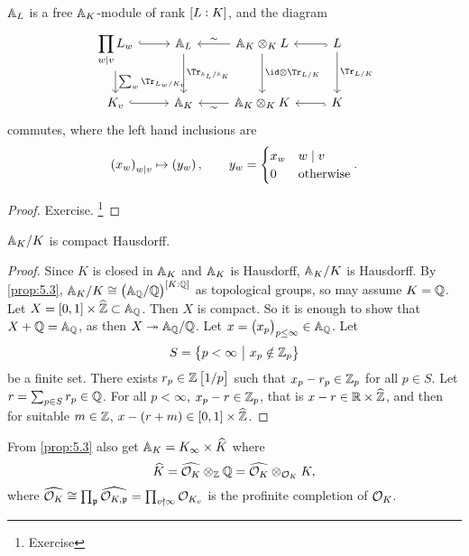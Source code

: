 \pagebreak

\begin{corollary}
$ \AA_L $ is a free $ \AA_K $-module of rank $ \sbr{L : K} $, and the diagram
$$
\begin{tikzcd}
\displaystyle\prod_{w \mid v} L_w \arrow[hookrightarrow]{r} \arrow{d}{\sum_w \Tr_{L_w / K_v}} & \AA_L \arrow{d}{\Tr_{\AA_L / \AA_K}} & \AA_K \otimes_K L \arrow{l}[swap]{\sim} \arrow{d}{\id \otimes \Tr_{L / K}} & L \arrow[hookrightarrow]{l} \arrow{d}{\Tr_{L / K}} \\
K_v \arrow[hookrightarrow]{r} & \AA_K & \AA_K \otimes_K K \arrow{l}{\sim} & K \arrow[hookrightarrow]{l}
\end{tikzcd}
$$
commutes, where the left hand inclusions are
$$ \br{x_w}_{w \mid v} \mapsto \br{y_w}, \qquad y_w =
\begin{cases}
x_w & w \mid v \\
0 & \text{otherwise}
\end{cases}.
$$
\end{corollary}

\begin{proof}
Exercise. \footnote{Exercise}
\end{proof}

\begin{theorem}
$ \AA_K / K $ is compact Hausdorff.
\end{theorem}

\begin{proof}
Since $ K $ is closed in $ \AA_K $ and $ \AA_K $ is Hausdorff, $ \AA_K / K $ is Hausdorff. By \ref{prop:5.3}, $ \AA_K / K \cong \br{\AA_\QQ / \QQ}^{\sbr{K : \QQ}} $ as topological groups, so may assume $ K = \QQ $. Let $ X = \sbr{0, 1} \times \widehat{\ZZ} \subset \AA_\QQ $. Then $ X $ is compact. So it is enough to show that $ X + \QQ = \AA_\QQ $, as then $ X \twoheadrightarrow \AA_\QQ / \QQ $. Let $ x = \br{x_p}_{p \le \infty} \in \AA_\QQ $. Let
$$ S = \cbr{p < \infty \st x_p \notin \ZZ_p} $$
be a finite set. There exists $ r_p \in \ZZ\sbr{1 / p} $ such that $ x_p - r_p \in \ZZ_p $ for all $ p \in S $. Let $ r = \sum_{p \in S} r_p \in \QQ $. For all $ p < \infty $, $ x_p - r \in \ZZ_p $, that is $ x - r \in \RR \times \widehat{\ZZ} $, and then for suitable $ m \in \ZZ $, $ x - \br{r + m} \in \sbr{0, 1} \times \widehat{\ZZ} $.
\end{proof}

From \ref{prop:5.3} also get $ \AA_K = K_\infty \times \widehat{K} $ where
$$ \widehat{K} = \widehat{\OOO_K} \otimes_\ZZ \QQ = \widehat{\OOO_K} \otimes_{\OOO_K} K, $$
where $ \widehat{\OOO_K} \cong \prod_\ppp \widehat{\OOO_{K, \ppp}} = \prod_{v \nmid \infty} \OOO_{K_v} $ is the profinite completion of $ \OOO_K $.

